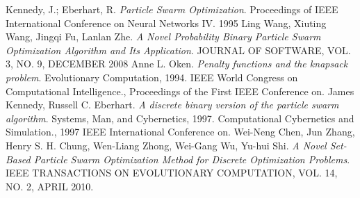 \documentclass{article}
\begin{document}
\newpage

\begin{thebibliography}{99}
		Kennedy, J.; Eberhart, R.
		\emph{Particle Swarm Optimization}.
		Proceedings of IEEE International Conference on Neural Networks IV.
		1995
		Ling Wang, Xiuting Wang, Jingqi Fu, Lanlan Zhe.
	  	\emph{A Novel Probability Binary Particle Swarm Optimization Algorithm and Its Application}.
	  	JOURNAL OF SOFTWARE, VOL. 3, NO. 9, DECEMBER 2008
		Anne L. Oken.
		\emph{Penalty functions and the knapsack problem}.
		Evolutionary Computation, 1994. IEEE World Congress on Computational Intelligence., Proceedings of the First IEEE Conference on.
		James Kennedy, Russell C. Eberhart.
		\emph{A discrete binary version of the particle swarm algorithm}.
		Systems, Man, and Cybernetics, 1997. Computational Cybernetics and Simulation., 1997 IEEE International Conference on.
		Wei-Neng Chen, Jun Zhang, Henry S. H. Chung, Wen-Liang Zhong, Wei-Gang Wu, Yu-hui Shi.
		\emph{A Novel Set-Based Particle Swarm Optimization Method for Discrete Optimization Problems}.
		IEEE TRANSACTIONS ON EVOLUTIONARY COMPUTATION, VOL. 14, NO. 2, APRIL 2010.
\end{thebibliography}
\end{document}

